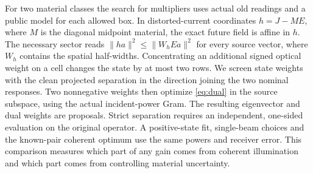 For two material classes the search for multipliers uses actual old readings and a public model for each allowed box. In distorted-current coordinates $h=J-ME$, where $M$ is the diagonal midpoint material, the exact future field is affine in $h$. The necessary sector reads $\|h a\|^2\leq\|W_h E a\|^2$ for every source vector, where $W_h$ contains the spatial half-widths. Concentrating an additional signed optical weight on a cell changes the state by at most two rows. We screen state weights with the clean projected separation in the direction joining the two nominal responses. Two nonnegative weights then optimize \eqref{eq:dual} in the source subspace, using the actual incident-power Gram. The resulting eigenvector and dual weights are proposals. Strict separation requires an independent, one-sided evaluation on the original operator. A positive-state fit, single-beam choices and the known-pair coherent optimum use the same powers and receiver error. This comparison measures which part of any gain comes from coherent illumination and which part comes from controlling material uncertainty.
